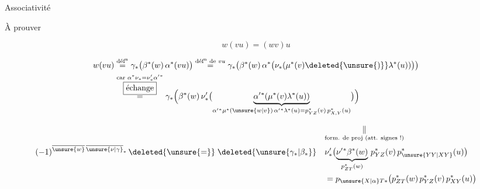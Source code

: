Associativité


À prouver


\[
w(vu)=(wv)u
\]



\[
\begin{aligned}
w(vu)&\overset{\text{déf\textsuperscript{n}}}{=}\gamma_*\bigl(\beta^*(w)\,\alpha^*(vu)\bigr)
\overset{\text{déf\textsuperscript{n} de }vu}{=}\gamma_*\bigl(\beta^*(w)\,\alpha^*\bigl(\nu_*(\mu^*(v)\deleted{\unsure{)}}\lambda^*(u))\bigr)\bigr)\\
&\overset{\substack{\text{car }\alpha^*\nu_*=\nu'_*\alpha'{}^*\\\boxed{\text{échange}}}}{=}
\gamma_*\Bigl(\beta^*(w)\,\nu'_*\bigl(\underbrace{\alpha'{}^*(\mu^*(v)\lambda^*(u))}_{\alpha'{}^*\mu^*(\unsure{w|v})\,\alpha'{}^*\lambda^*(u)=p_{YZ}^*(v)\,p_{X,Y}^*(u)}\bigr)\Bigr)
\end{aligned}
\]

\[
\begin{aligned}
&\underset{\text{form. de proj (att. signes !)}}{\Vert}\\
(-1)^{\overline{\unsure{w}}\,\overline{\unsure{\nu|\gamma}}_*}\,\deleted{\unsure{=}}\;\deleted{\unsure{\gamma_*|\beta_*}}\quad&
\nu'_*\bigl(\underbrace{\nu'{}^*\beta^*(w)}_{p_{ZT}^*(w)}\,p_{YZ}^*(v)\,p_{\unsure{YY|XY}}^*(u)\bigr)\\
&=p_{\unsure{X|\alpha}T*}\bigl(p_{ZT}^*(w)\,p_{YZ}^*(v)\,p_{XY}^*(u)\bigr)
\end{aligned}
\]

